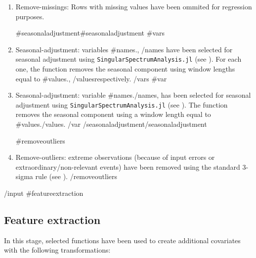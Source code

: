 \documentclass{article}
\begin{document}
\begin{enumerate}
  \item Remove-missings: Rows with missing values have been ommited for regression purposes.

  {{#seasonaladjustment}}{{#seasonaladjustment}}
    {{#vars}}
      \item Seasonal-adjustment: variables {{#names}}{{.}}, {{/names}} have been selected for seasonal adjustment using \verb|SingularSpectrumAnalysis.jl|  (see \cite{hassani2007}). For each one, the function removes the seasonal component using window lengths equal to {{#values}}{{.}}, {{/values}}respectively.
    {{/vars}}
    {{#var}}
      \item Seasonal-adjustment: variable {{#names}}{{.}}{{/names}}, has been selected for seasonal adjustment using \verb|SingularSpectrumAnalysis.jl|  (see \cite{hassani2007}). The function removes the seasonal component using a window length equal to {{#values}}{{.}}{{/values}}.
    {{/var}}
  {{/seasonaladjustment}}{{/seasonaladjustment}}

  {{#removeoutliers}} 
  \item Remove-outliers: extreme observations (because of input errors or extraordinary/non-relevant events) have been removed using the standard 3-sigma rule (see \cite{lehmann2013}).
  {{/removeoutliers}}
\end{enumerate}
{{/input}}
{{#featureextraction}}
\subsection{Feature extraction}

In this stage, selected functions have been used to create additional covariates with the following transformations:  
\end{document}
